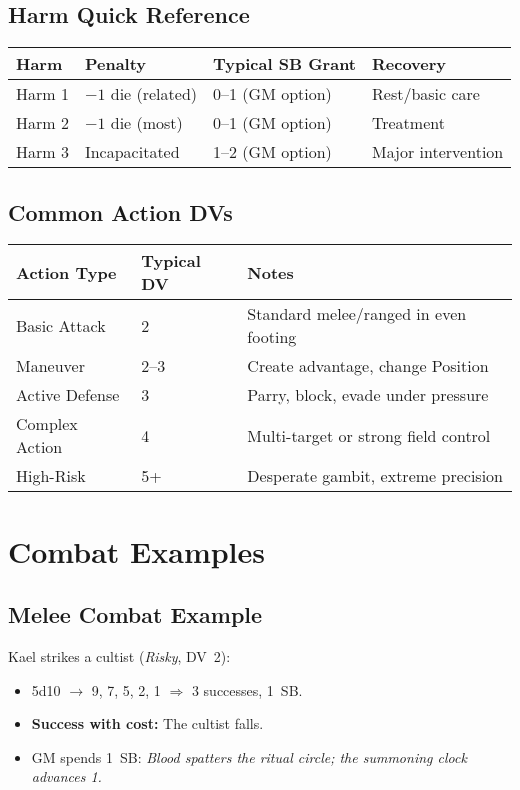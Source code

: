 \subsection{Harm Quick Reference}
\label{subsec:harm-quick-ref}
\begin{center}
\begin{tabular}{llll}
\toprule
\textbf{Harm} & \textbf{Penalty} & \textbf{Typical SB Grant} & \textbf{Recovery} \\
\midrule
Harm 1   & $-1$ die (related) & 0--1 (GM option) & Rest/basic care \\
Harm 2   & $-1$ die (most)    & 0--1 (GM option) & Treatment \\
Harm 3   & Incapacitated      & 1--2 (GM option) & Major intervention \\
\bottomrule
\end{tabular}
\end{center}

\subsection{Common Action DVs}
\label{subsec:action-dvs}
\begin{center}
\begin{tabular}{lll}
\toprule
\textbf{Action Type} & \textbf{Typical DV} & \textbf{Notes} \\
\midrule
Basic Attack    & 2   & Standard melee/ranged in even footing \\
Maneuver        & 2--3& Create advantage, change Position \\
Active Defense  & 3   & Parry, block, evade under pressure \\
Complex Action  & 4   & Multi-target or strong field control \\
High-Risk       & 5+  & Desperate gambit, extreme precision \\
\bottomrule
\end{tabular}
\end{center}

\section{Combat Examples}
\label{sec:combat-examples}

\subsection{Melee Combat Example}
\label{subsec:melee-example}
Kael strikes a cultist (\textit{Risky}, DV~2):
\begin{itemize}
  \item 5d10 $\rightarrow$ 9, 7, 5, 2, 1 $\Rightarrow$ 3 successes, 1~SB.
  \item \textbf{Success with cost:} The cultist falls.
  \item GM spends 1~SB: \emph{Blood spatters the ritual circle; the summoning clock advances 1.}
\end{itemize}

